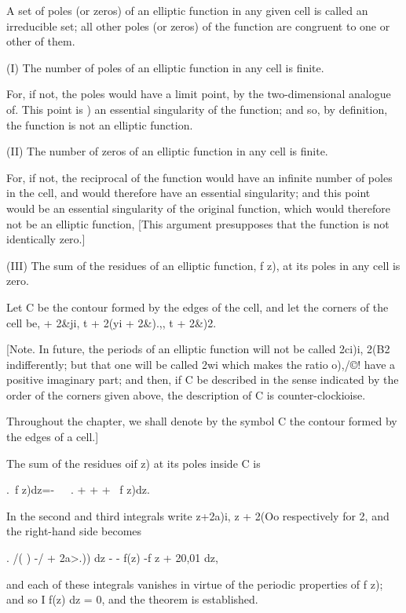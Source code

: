 A set of poles (or zeros) of an elliptic function in any given cell is
called an irreducible set; all other poles (or zeros) of the function
are congruent to one or other of them.

%
%


(I) The number of poles of an elliptic function in any cell is finite.

For, if not, the poles would have a limit point, by the
two-dimensional analogue of. This point is ) an
essential singularity of the function; and so, by definition, the
function is not an elliptic function.

(II) The number of zeros of an elliptic function in any cell is
finite.

For, if not, the reciprocal of the function would have an infinite
number of poles in the cell, and would therefore have an essential
singularity; and this point would be an essential singularity of the
original function, which would therefore not be an elliptic function,
[This argument presupposes that the function is not identically zero.]

(III) The sum of the residues of an elliptic function, f z), at its
poles in any cell is zero.

Let C be the contour formed by the edges of the cell, and let the
corners of the cell be, + 2\&ji, t + 2(yi + 2\&).,, t + 2\&)2.

[Note. In future, the periods of an elliptic function will not be
called 2ci)i, 2(B2 indifferently; but that one will be called 2wi
which makes the ratio o),/©! have a positive imaginary part; and
then, if C be described in the sense indicated by the order of the
corners given above, the description of C is counter-clockioise.

Throughout the chapter, we shall denote by the symbol C the contour
formed by the edges of a cell.]

The sum of the residues oif z) at its poles inside C is

 .\ f z)dz=-~\ \ . + + + \ f z)dz.

In the second and third integrals write z+2a)i, z + 2(Oo respectively
for 2, and the right-hand side becomes

 . /( ) -/ + 2a>.)) dz - - f(z) -f z + 20,01 dz,

and each of these integrals vanishes in virtue of the periodic
properties of f z); and so I f(z) dz = 0, and the theorem is
established.

